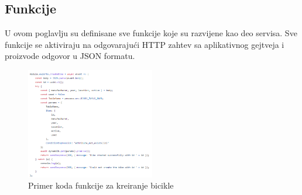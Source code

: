 \documentclass[12pt,oneside]{memoir}
\begin{document}
\subsection{Funkcije}
U ovom poglavlju su definisane sve funkcije koje su razvijene kao deo servisa. Sve funkcije se aktiviraju na odgovarajući HTTP zahtev sa aplikativnog gejtveja i proizvode odgovor u JSON formatu.

\begin{figure}[!ht]
  \centering
  \includegraphics[width=0.5\textwidth]{createBikeFunc.png}
  \caption{Primer koda funkcije za kreiranje bicikle}
  \label{fig:createBikeFunc}
\end{figure}

\end{document}
